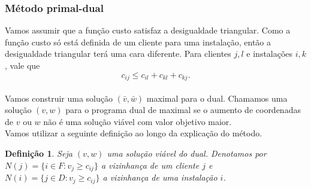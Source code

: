 \documentclass[12pt]{article}
\newtheorem{definition}[theorem]{Definição}
\begin{document}
\subsubsection{Método primal-dual}
Vamos assumir que a função custo satisfaz a desigualdade triangular. Como a função custo só está definida de um cliente para uma instalação, então a desigualdade triangular terá uma cara diferente. Para clientes $j,l$ e  instalações $i,k$, vale que
\[c_{ij} \leq c_{il} + c_{kl} + c_{kj}.\]
\\
Vamos construir uma solução $(\bar{v},\bar{w})$ maximal para o dual. Chamamos uma solução $(v,w)$ para o programa dual de maximal se o aumento de coordenadas de $v$ ou $w$ não é uma solução viável com valor objetivo maior.\\
Vamos utilizar a seguinte definição ao longo da explicação do método.
\begin{definition}
    Seja $(v,w)$ uma solução viável do dual. Denotamos por $N(j) = \{i \in F:v_j \geq c_{ij}\}$ a \emph{vizinhança} de um cliente $j$ e $N(i) = \{j \in D:v_j \geq c_{ij}\}$ a \emph{vizinhança} de uma instalação $i$.
\end{definition}
\end{document}
